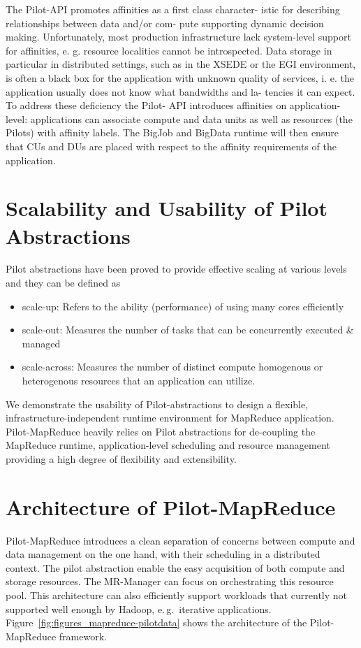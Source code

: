 \documentclass[12pt]{report}
\newcommand{\pilotmapreduce}{Pilot-MapReduce\xspace}
\newcommand{\mrmg}{MR-Manager\xspace}
\begin{document}
The Pilot-API promotes affinities as a first class character- istic for describing relationships between data and/or com- pute supporting dynamic decision making. Unfortunately, most production infrastructure lack system-level support for affinities, e. g. resource localities cannot be introspected. Data storage in particular in distributed settings, such as in the XSEDE or the EGI environment, is often a black box for the application with unknown quality of services, i. e. the application usually does not know what bandwidths and la- tencies it can expect. To address these deficiency the Pilot- API introduces affinities on application-level: applications can associate compute and data units as well as resources (the Pilots) with affinity labels. The BigJob and BigData runtime will then ensure that CUs and DUs are placed with respect to the affinity requirements of the application.

\section{Scalability and Usability of Pilot Abstractions} \label{sec:pilot-sol-ci}
Pilot abstractions have been proved to provide effective scaling at various levels ~\cite{repex,pstar, bigjob} and they can be defined as
\begin{itemize}
\item{scale-up: Refers to the ability (performance) of using many cores efficiently}
\item{scale-out: Measures the number of tasks that can be concurrently executed \& managed}
\item{scale-across: Measures the number of distinct compute homogenous or heterogenous resources  that an application can utilize.}
\end{itemize}

We demonstrate the usability of Pilot-abstractions to design a flexible, infrastructure-independent runtime environment for MapReduce application. Pilot-MapReduce heavily relies on Pilot abstractions for de-coupling the MapReduce runtime, application-level scheduling and resource management providing a high degree of flexibility and extensibility.

\section{Architecture of \pilotmapreduce} \label{sec:pilot-mr}
\pilotmapreduce introduces a clean separation of concerns between
compute and data management on the one hand, with their scheduling in
a distributed context. The pilot abstraction enable the easy
acquisition of both compute and storage resources. The \mrmg can
focus on orchestrating this resource pool. This architecture can also
efficiently support workloads that currently not supported well
enough by Hadoop, e.\,g.\ iterative
applications. Figure~\ref{fig:figures_mapreduce-pilotdata} shows the
architecture of the \pilotmapreduce framework.
\end{document}
